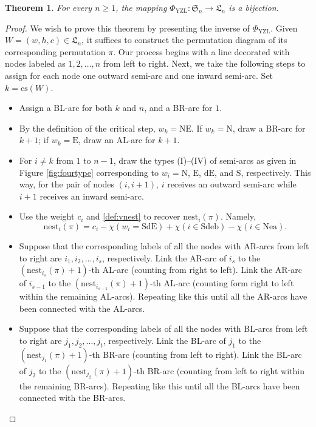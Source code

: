 \documentclass[12pt]{amsart}
\numberwithin{equation}{section}
\theoremstyle{plain}
\newtheorem{theorem}{Theorem}[section]
\theoremstyle{definition}
\def\YZL{\mathrm{YZL}}
\def\SS{\mathfrak{S}}
\def\LH{\mathfrak{L}}
\def\N{\mathrm{N}}
\def\S{\mathrm{S}}
\def\E{\mathrm{E}}
\def\dE{\mathrm{dE}}
\def\NE{\mathrm{NE}}
\def\SdE{\mathrm{SdE}}
\def\cs{\mathrm{cs}}
\def\Nea{\mathrm{Nea}}
\def\Sdeb{\mathrm{Sdeb}}
\def\nest{\mathrm{nest}}
\begin{document}
\begin{theorem}
For every $n\ge 1$, the mapping $\Phi_{\YZL}:\SS_n\to \LH_n$ is a bijection.
\end{theorem}
\begin{proof}
We wish to prove this theorem by presenting the inverse of $\Phi_{\YZL}$. Given $W=(w,h,c) \in \LH_n$, it suffices to construct the permutation diagram of its corresponding permutation $\pi$. Our process begins with a line decorated with nodes labeled as $1,2,\ldots,n$ from left to right. Next, we take the following steps to assign for each node one outward semi-arc and one inward semi-arc. Set $k=\cs(W)$.
\begin{itemize}
  \item Assign a BL-arc for both $k$ and $n$, and a BR-arc for $1$.
  \item By the definition of the critical step, $w_{k}=\NE$. If $w_{k}=\N$, draw a BR-arc for $k+1$; if $w_k=\E$, draw an AL-arc for $k+1$.
  \item For $i\neq k$ from $1$ to $n-1$, draw the types (I)--(IV) of semi-arcs as given in Figure \ref{fig:fourtype} corresponding to $w_i=\N$, $\E$, $\dE$, and $\S$, respectively. This way, for the pair of nodes $(i,i+1)$, $i$ receives an outward semi-arc while $i+1$ receives an inward semi-arc.
  \item Use the weight $c_i$ and \eqref{def:vnest} to recover $\nest_i(\pi)$. Namely,
  \[\nest_i(\pi)=c_i-\chi(w_i=\SdE)+\chi(i \in \Sdeb)-\chi(i \in \Nea).\]
  \item Suppose that the corresponding labels of all the nodes with AR-arcs from left to right are $i_1,i_2,\ldots,i_s$, respectively. Link the AR-arc of $i_s$ to the $(\nest_{i_s}(\pi)+1)$-th AL-arc (counting from right to left). Link the AR-arc of $i_{s-1}$ to the $(\nest_{i_{s-1}}(\pi)+1)$-th AL-arc (counting form right to left within the remaining AL-arcs). Repeating like this until all the AR-arcs have been connected with the AL-arcs.
  \item Suppose that the corresponding labels of all the nodes with BL-arcs from left to right are $j_1,j_2,\ldots, j_t$, respectively. Link the BL-arc of $j_1$ to the $(\nest_{j_1}(\pi)+1)$-th BR-arc (counting from left to right). Link the BL-arc of $j_2$ to the $(\nest_{j_2}(\pi)+1)$-th BR-arc (counting from left to right within the remaining  BR-arcs). Repeating like this until all the BL-arcs have been connected with the BR-arcs.
\end{itemize}


\end{proof}
\end{document}
